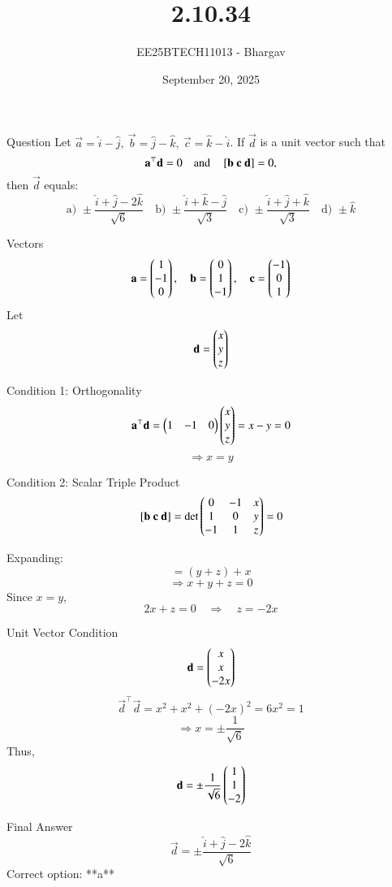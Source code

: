 \documentclass{beamer}
\title{2.10.34}
\author{EE25BTECH11013 - Bhargav}
\date{September 20, 2025}
\begin{document}
\frame{\titlepage}

\begin{frame}{Question}
Let $\vec{a} = \hat{i} - \hat{j}, \ \vec{b} = \hat{j} - \hat{k}, \ \vec{c} = \hat{k} - \hat{i}$.  
If $\vec{d}$ is a unit vector such that 
\[
\mathbf{a}^\top \mathbf{d} = 0 \quad \text{and} \quad 
{}\left[\mathbf{b} \ \mathbf{c} \ \mathbf{d}\right] = 0,
\]
then $\vec{d}$ equals:
\[
\text{a) } \pm \frac{\hat{i}+\hat{j}-2\hat{k}}{\sqrt{6}} \quad
\text{b) } \pm \frac{\hat{i}+\hat{k}-\hat{j}}{\sqrt{3}} \quad
\text{c) } \pm \frac{\hat{i}+\hat{j}+\hat{k}}{\sqrt{3}} \quad
\text{d) } \pm \hat{k}
\]
\end{frame}

\begin{frame}{Vectors}
\[
\mathbf{a} = \begin{pmatrix}1\\-1\\0\end{pmatrix}, \quad
\mathbf{b} = \begin{pmatrix}0\\1\\-1\end{pmatrix}, \quad
\mathbf{c} = \begin{pmatrix}-1\\0\\1\end{pmatrix}
\]
Let
\[
\mathbf{d} = \begin{pmatrix}x\\y\\z\end{pmatrix}
\]
\end{frame}

\begin{frame}{Condition 1: Orthogonality}
\[
\mathbf{a}^\top \mathbf{d} = \begin{pmatrix}1 & -1 & 0\end{pmatrix}\begin{pmatrix}x\\y\\z\end{pmatrix} = x - y = 0
\]
\[
\Rightarrow x = y
\]
\end{frame}

\begin{frame}{Condition 2: Scalar Triple Product}
\[
{}\left[\mathbf{b} \ \mathbf{c} \ \mathbf{d}\right] =
\det\begin{pmatrix}0 & -1 & x \\ 1 & 0 & y \\ -1 & 1 & z\end{pmatrix} = 0
\]

Expanding:
\[
= (y+z) + x
\]
\[
\Rightarrow x + y + z = 0
\]
Since $x=y$,
\[
2x+z=0 \quad \Rightarrow \quad z=-2x
\]
\end{frame}

\begin{frame}{Unit Vector Condition}
\[
\mathbf{d} = \begin{pmatrix}x\\x\\-2x\end{pmatrix}
\]
\[
\vec{d}^\top \vec{d} = x^2 + x^2 + (-2x)^2 = 6x^2 = 1
\]
\[
\Rightarrow x = \pm \frac{1}{\sqrt{6}}
\]
Thus,
\[
\mathbf{d} = \pm \frac{1}{\sqrt{6}} \begin{pmatrix}1\\1\\-2\end{pmatrix}
\]
\end{frame}

\begin{frame}{Final Answer}
\[
\vec{d} = \pm \frac{\hat{i} + \hat{j} - 2\hat{k}}{\sqrt{6}}
\]
Correct option: **a**
\end{frame}
\end{document}
